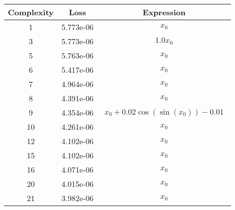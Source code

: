 \begin{center}
        \begin{tabular}{|c|c|c|}
        \hline
        Complexity & Loss & Expression \\
        \hline
        1 & 5.773e-06 & $\begin{aligned}x_{0}\end{aligned}$\\ \hline3 & 5.773e-06 & $\begin{aligned}1.0 x_{0}\end{aligned}$\\ \hline5 & 5.763e-06 & $\begin{aligned}x_{0}\end{aligned}$\\ \hline6 & 5.417e-06 & $\begin{aligned}x_{0}\end{aligned}$\\ \hline7 & 4.964e-06 & $\begin{aligned}x_{0}\end{aligned}$\\ \hline8 & 4.391e-06 & $\begin{aligned}x_{0}\end{aligned}$\\ \hline9 & 4.354e-06 & $\begin{aligned}x_{0} + 0.02 \cos{\left(\sin{\left(x_{0} \right)} \right)} - 0.01\end{aligned}$\\ \hline10 & 4.261e-06 & $\begin{aligned}x_{0}\end{aligned}$\\ \hline12 & 4.102e-06 & $\begin{aligned}x_{0}\end{aligned}$\\ \hline15 & 4.102e-06 & $\begin{aligned}x_{0}\end{aligned}$\\ \hline16 & 4.071e-06 & $\begin{aligned}x_{0}\end{aligned}$\\ \hline20 & 4.015e-06 & $\begin{aligned}x_{0}\end{aligned}$\\ \hline21 & 3.982e-06 & $\begin{aligned}x_{0}\end{aligned}$\\ \hline\end{tabular}
        \end{center}
        